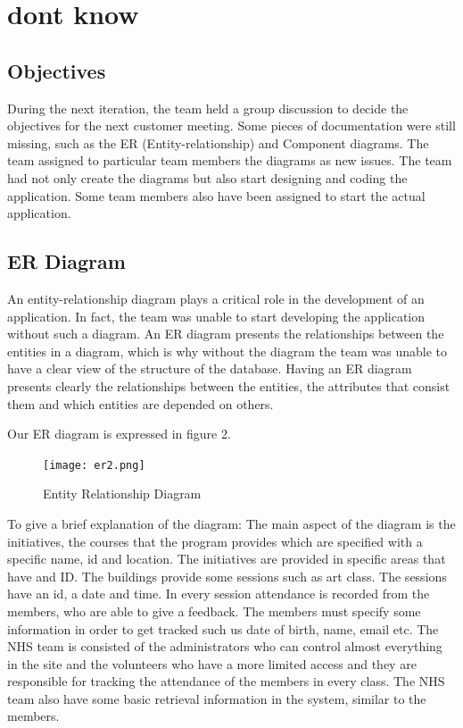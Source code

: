 \documentclass{l3proj}
\begin{document}
\section{dont know}
\label{sec:dont know}

\subsection{Objectives}
\label{sec:objectives}

During the next iteration, the team held a group discussion to decide the objectives for the next customer meeting. Some pieces of documentation were still missing, such as the ER (Entity-relationship) and Component diagrams. The team assigned to particular team members the diagrams as new issues. The team had not only create the diagrams but also start designing and coding the application. Some team members also have been assigned to start the actual application.

\subsection{ER Diagram}
\label{sec:er}

An entity-relationship diagram plays a critical role in the development of an application. In fact, the team was unable to start developing the application without such a diagram. An ER diagram presents the relationships between the entities in a diagram, which is why without the diagram the team was unable to have a clear view of the structure of the database. Having an ER diagram presents clearly the relationships between the entities, the attributes that consist them and which entities are depended on others.

Our ER diagram is expressed in figure 2.

\begin{figure}
  \centerline{\texttt{[image: er2.png]}}
  \caption{Entity Relationship Diagram}
  \label{fig:er}
\end{figure}

To give a brief explanation of the diagram: The main aspect of the diagram is the initiatives, the courses that the program provides which are specified with a specific name, id and location. The initiatives are provided in specific areas that have and ID. The buildings provide some sessions such as art class. The sessions have an id, a date and time. In every session attendance is recorded from the members, who are able to give a feedback. The members must specify some information in order to get tracked such us date of birth, name, email etc. The NHS team is consisted of the administrators who can control almost everything in the site and the volunteers who have a more limited access and they are responsible for tracking the attendance of the members in every class. The NHS team also have some basic retrieval information in the system, similar to the members.
\end{document}
